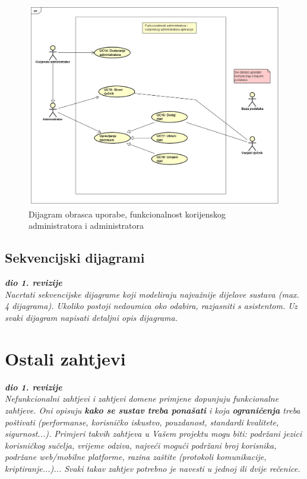 					\begin{figure}[H]
						\includegraphics[width=\textwidth]{dijagrami/ucdiag2.png} %
						\caption{Dijagram obrasca uporabe, funkcionalnost korijenskog administratora i administratora}
						\label{fig:ucdiag2} %
					\end{figure}

				\eject		
				
			\subsection{Sekvencijski dijagrami}
				
				\textbf{\textit{dio 1. revizije}}\\
				
				\textit{Nacrtati sekvencijske dijagrame koji modeliraju najvažnije dijelove sustava (max. 4 dijagrama). Ukoliko postoji nedoumica oko odabira, razjasniti s asistentom. Uz svaki dijagram napisati detaljni opis dijagrama.}
				\eject
	
		\section{Ostali zahtjevi}
		
			\textbf{\textit{dio 1. revizije}}\\
		 
			 \textit{Nefunkcionalni zahtjevi i zahtjevi domene primjene dopunjuju funkcionalne zahtjeve. Oni opisuju \textbf{kako se sustav treba ponašati} i koja \textbf{ograničenja} treba poštivati (performanse, korisničko iskustvo, pouzdanost, standardi kvalitete, sigurnost...). Primjeri takvih zahtjeva u Vašem projektu mogu biti: podržani jezici korisničkog sučelja, vrijeme odziva, najveći mogući podržani broj korisnika, podržane web/mobilne platforme, razina zaštite (protokoli komunikacije, kriptiranje...)... Svaki takav zahtjev potrebno je navesti u jednoj ili dvije rečenice.}
			 
			 
			 
	